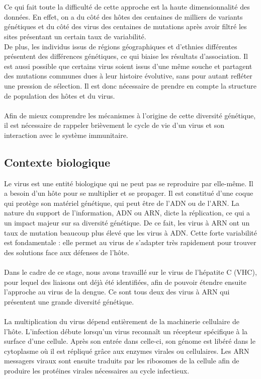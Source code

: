 \documentclass[11pt,a4paper]{article}
\begin{document}
\\
\\
Ce qui fait toute la difficulté de cette approche est la haute dimensionnalité des données. En effet, on a du côté des hôtes des centaines de milliers de variants génétiques et du côté des virus des centaines de mutations après avoir filtré les sites présentant un certain taux de variabilité.
\\
De plus, les individus issus de régions géographiques et d'ethnies différentes présentent des différences génétiques, ce qui biaise les résultats d'association.
Il est aussi possible que certains virus soient issus d'une même souche et partagent des mutations communes dues à leur histoire évolutive, sans pour autant refléter une pression de sélection.
Il est donc nécessaire de prendre en compte la structure de population des hôtes et du virus.
\\
\\
Afin de mieux comprendre les mécanismes à l'origine de cette diversité génétique, il est nécessaire de rappeler brièvement le cycle de vie d'un virus et son interaction avec le système immunitaire.

\subsection{Contexte biologique}

Le virus est une entité biologique qui ne peut pas se reproduire par elle-même. Il a besoin d'un hôte pour se multiplier et se propager. Il est constitué d'une coque qui protège son matériel génétique, qui peut être de l'ADN ou de l'ARN.
La nature du support de l'information, ADN ou ARN, dicte la réplication, ce qui a un impact majeur sur sa diversité génétique. De ce fait, les virus à ARN ont un taux de mutation beaucoup plus élevé que les virus à ADN.
Cette forte variabilité est fondamentale : elle permet au virus de s'adapter très rapidement pour trouver des solutions face aux défenses de l'hôte.
\\
\\
Dans le cadre de ce stage, nous avons travaillé sur le virus de l'hépatite C (VHC), pour lequel des liaisons ont déjà été identifiées, afin de pouvoir étendre ensuite l'approche au virus de la dengue. Ce sont tous deux des virus à ARN qui présentent une grande diversité génétique.
\\
\\
La multiplication du virus dépend entièrement de la machinerie cellulaire de l'hôte. L'infection débute lorsqu'un virus reconnaît un récepteur spécifique à la surface d'une cellule.
Après son entrée dans celle-ci, son génome est libéré dans le cytoplasme où il est répliqué grâce
aux enzymes virales ou cellulaires. Les ARN messagers viraux sont ensuite traduits par les
ribosomes de la cellule afin de produire les protéines virales nécessaires au cycle infectieux.
\end{document}
